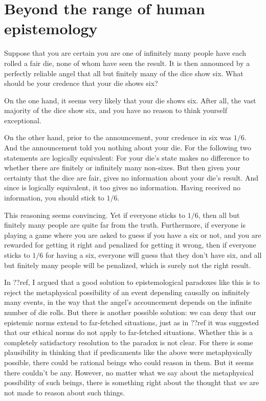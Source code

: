 \section{Beyond the range of human epistemology}
Suppose that you are certain you are one of infinitely many people have each rolled a fair die, none of whom have seen the 
result. It is then announced by a perfectly reliable angel that all but finitely many of the dice show six. 
What should be your credence that your die shows six? 

On the one hand, it seems very likely that your die shows six. After all, the vast majority of the dice show
six, and you have no reason to think yourself exceptional. 

On the other hand, prior to the announcement, your credence in six was $1/6$. And the announcement told you nothing 
about your die. For the following two statements are logically equivalent:
For your die's state makes no difference to whether there are finitely or infinitely many non-sixes.
But then given your certainty that the dice are fair,  gives no information about 
your die's result. And since  is logically equivalent, it too gives no information.
Having received no information, you should stick to $1/6$. 

This reasoning seems convincing. Yet if everyone sticks to $1/6$, then all but finitely many people are quite far 
from the truth. Furthermore, if everyone is playing a game where you are asked to guess if you have a six or not,
and you are rewarded for getting it right and penalized for getting it wrong, then if everyone sticks to $1/6$
for having a six, everyone will guess that they don't have six, and all but finitely many people will be penalized,
which is surely not the right result.

In ??ref, I argued that a good solution to epistemological paradoxes like this is to reject the metaphysical possibility
of an event depending causally on infinitely many events, in the way that the angel's accouncement depends on the infinite
number of die rolls. But there is another possible solution: we can deny that our epistemic norms extend to far-fetched
situations, just as in ??ref it was suggested that our ethical norms do not apply to far-fetched situations. Whether this is 
a completely satisfactory resolution to the paradox is not clear. For there is some plausibility in thinking that if 
predicaments like the above were metaphysically possible, there could be rational beings who could reason
in them. But it seems there couldn't be any. However, no matter what we say about the metaphysical possibility of such beings,
there is something right about the thought that \textit{we} are not made to reason about such things.

